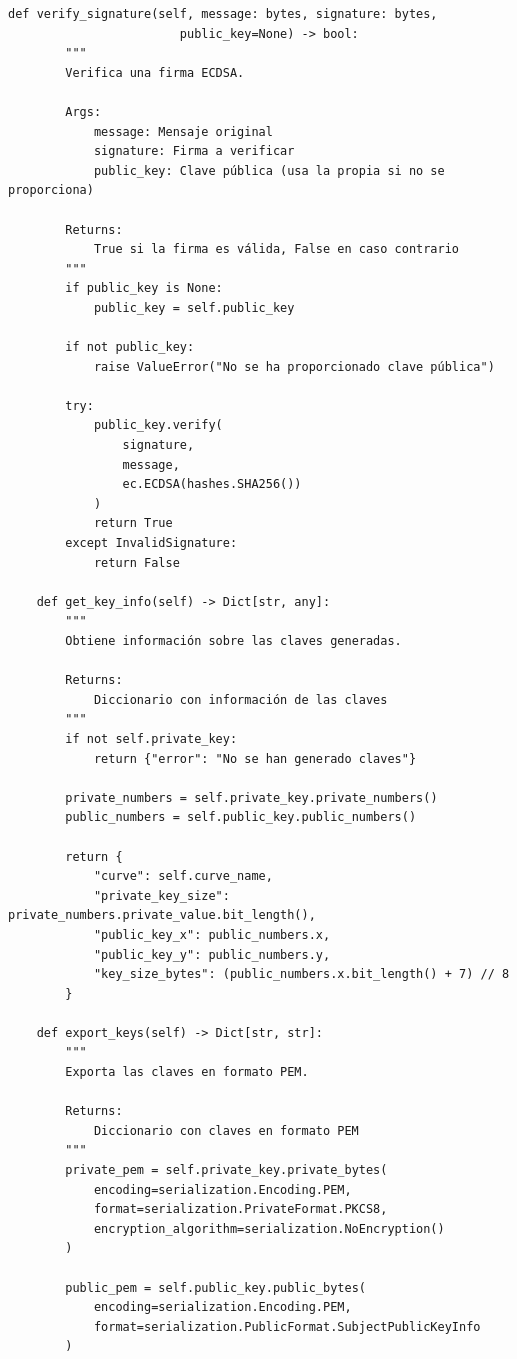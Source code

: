 \documentclass[12pt,a4paper]{article}
\begin{document}
\begin{lstlisting}[caption=Implementación de firma digital con curvas elípticas]
    def verify_signature(self, message: bytes, signature: bytes, 
                        public_key=None) -> bool:
        """
        Verifica una firma ECDSA.
        
        Args:
            message: Mensaje original
            signature: Firma a verificar
            public_key: Clave pública (usa la propia si no se proporciona)
            
        Returns:
            True si la firma es válida, False en caso contrario
        """
        if public_key is None:
            public_key = self.public_key
            
        if not public_key:
            raise ValueError("No se ha proporcionado clave pública")
            
        try:
            public_key.verify(
                signature,
                message,
                ec.ECDSA(hashes.SHA256())
            )
            return True
        except InvalidSignature:
            return False
    
    def get_key_info(self) -> Dict[str, any]:
        """
        Obtiene información sobre las claves generadas.
        
        Returns:
            Diccionario con información de las claves
        """
        if not self.private_key:
            return {"error": "No se han generado claves"}
            
        private_numbers = self.private_key.private_numbers()
        public_numbers = self.public_key.public_numbers()
        
        return {
            "curve": self.curve_name,
            "private_key_size": private_numbers.private_value.bit_length(),
            "public_key_x": public_numbers.x,
            "public_key_y": public_numbers.y,
            "key_size_bytes": (public_numbers.x.bit_length() + 7) // 8
        }
    
    def export_keys(self) -> Dict[str, str]:
        """
        Exporta las claves en formato PEM.
        
        Returns:
            Diccionario con claves en formato PEM
        """
        private_pem = self.private_key.private_bytes(
            encoding=serialization.Encoding.PEM,
            format=serialization.PrivateFormat.PKCS8,
            encryption_algorithm=serialization.NoEncryption()
        )
        
        public_pem = self.public_key.public_bytes(
            encoding=serialization.Encoding.PEM,
            format=serialization.PublicFormat.SubjectPublicKeyInfo
        )
        

\end{lstlisting}
\end{document}
